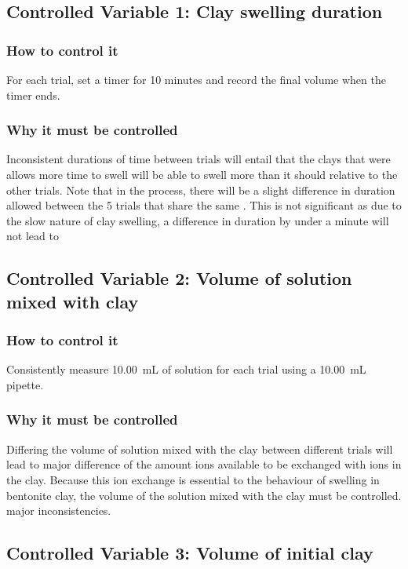 \documentclass[11pt, letterpaper]{article}
\begin{document}
\begin{paracol}{2}
    \subsection{Controlled Variable 1: Clay swelling duration}
    \subsubsection{How to control it}
    For each trial, set a timer for 10 minutes and record
    the final volume when the timer ends.
    \subsubsection{Why it must be controlled}
    Inconsistent durations of time between trials will entail
    that the clays that were allows more time to swell will be able
    to swell more than it should relative to the other trials.
    Note that in the process, there will be a slight difference in duration
    allowed between the 5 trials that share the same \ce{[H+]}.
    This is not significant as due to the slow nature of clay swelling,
    a difference in duration by under a minute will not lead to
    \switchcolumn
    \subsection{Controlled Variable 2: Volume of solution mixed with clay}
    \subsubsection{How to control it}
    Consistently measure \SI{10.00}{mL} of solution for each trial
    using a \SI{10.00}{mL} pipette.
    \subsubsection{Why it must be controlled}
    Differing the volume of solution mixed with the clay between different
    trials will lead to major difference of the amount  ions available to
    be exchanged with  ions in the clay. Because this ion
    exchange is essential to the behaviour of swelling in bentonite clay,
    the volume of the solution mixed with the clay must be controlled.
    major inconsistencies.
\end{paracol}

\subsection{Controlled Variable 3: Volume of initial clay}
\end{document}
